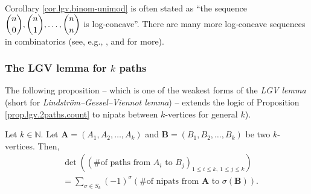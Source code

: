 \begin{definition}
Corollary \ref{cor.lgv.binom-unimod} is often stated as \textquotedblleft the
sequence $\dbinom{n}{0},\dbinom{n}{1},\ldots,\dbinom{n}{n}$ is
log-concave\textquotedblright. There are many more log-concave sequences in
combinatorics (see, e.g., \cite{Sagan19}, \cite{Stanle89} and \cite{Brande14}
for more).

\subsubsection{The LGV lemma for $k$ paths}

The following proposition -- which is one of the weakest forms of the
\emph{LGV lemma} (short for \emph{Lindstr\"{o}m--Gessel--Viennot lemma}) --
extends the logic of Proposition \ref{prop.lgv.2paths.count} to nipats between
$k$-vertices for general $k$).

\begin{proposition}
\label{prop.lgv.kpaths.count}Let
$k\in\mathbb{N}$. Let $\mathbf{A}=\left(  A_{1},A_{2},\ldots,A_{k}\right)  $
and $\mathbf{B}=\left(  B_{1},B_{2},\ldots,B_{k}\right)  $ be two
$k$-vertices. Then,%
\begin{align*}
&  \det\left(  \left(  \text{\# of paths from }A_{i}\text{ to }B_{j}\right)
_{1\leq i\leq k,\ 1\leq j\leq k}\right) \\
&  =\sum_{\sigma\in S_{k}}\left(  -1\right)  ^{\sigma}\left(  \text{\# of
nipats from }\mathbf{A}\text{ to }\sigma\left(  \mathbf{B}\right)  \right)  .
\end{align*}

\end{proposition}


\end{definition}
